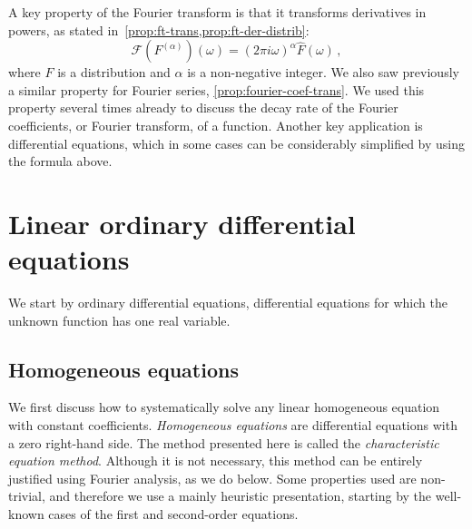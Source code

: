 A key property of the Fourier transform is that it transforms derivatives in powers, as
stated in~\cref{prop:ft-trans,prop:ft-der-distrib}:
\begin{equation}
  \mathcal{F}(F^{(\alpha)})(\omega)=(2\pi i\omega)^{\alpha}\hat{F}(\omega)\,,
\end{equation}
where $F$ is a distribution and $\alpha$ is a non-negative integer. We also saw previously
a similar property for Fourier series, \cf\cref{prop:fourier-coef-trans}. We used this
property several times already to discuss the decay rate of the Fourier coefficients, or
Fourier transform, of a function. Another key application is differential equations, which
in some cases can be considerably simplified by using the formula above.

\section{Linear ordinary differential equations}
We start by ordinary differential equations, \ie differential equations for which the
unknown function has one real variable.
\subsection{Homogeneous equations}
We first discuss how to systematically solve any linear homogeneous equation with constant
coefficients. \emph{Homogeneous equations} are differential equations with a zero
right-hand side. The method presented here is called the \emph{characteristic equation
method}. Although it is not necessary, this method can be entirely justified using Fourier
analysis, as we do below. Some properties used are non-trivial, and therefore we use a
mainly heuristic presentation, starting by the well-known cases of the first and
second-order equations.
